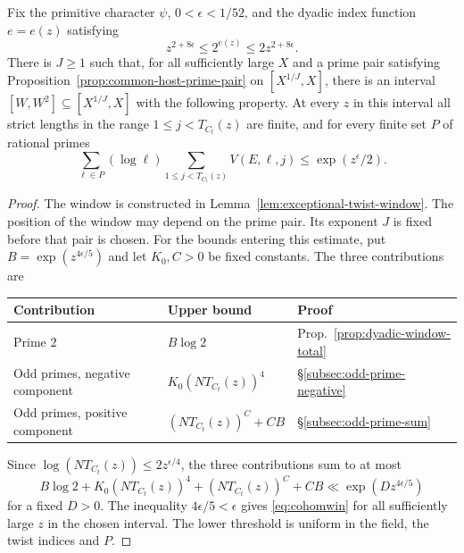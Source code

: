 \begin{proposition}
\label{prop:original-window-budget}
Fix the primitive character \(\psi\), \(0<\epsilon<1/52\), and the
dyadic index function \(e=e(z)\) satisfying
\[
                z^{2+8\epsilon}\le2^{e(z)}\le2z^{2+8\epsilon}.
\]
There is \(J\ge1\) such that, for all sufficiently large \(X\) and a
prime pair satisfying Proposition~\ref{prop:common-host-prime-pair} on
\([X^{1/J},X]\), there is an interval
\([W,W^2]\subseteq[X^{1/J},X]\) with the following property.
At every \(z\) in this interval all strict lengths in the range
\(1\le j<T_{C_t}(z)\) are finite, and for every finite set \(P\)
of rational primes
\begin{equation}\label{eq:cohomwin}
 \sum_{\ell\in P}(\log\ell)
       \sum_{1\le j<T_{C_t}(z)} V(E,\ell,j)
       \le \exp(z^\epsilon/2).
\end{equation}
\end{proposition}
\begin{proof}
The window is constructed in Lemma~\ref{lem:exceptional-twist-window}.
The position of the window may depend on the prime pair. Its exponent
\(J\) is fixed before that pair is chosen.
For the bounds entering this estimate, put
\(B=\exp(z^{4\epsilon/5})\) and let \(K_0,C>0\) be fixed
constants. The three contributions are
\begin{center}
\begin{tabular}{@{}lll@{}}
Contribution & Upper bound & Proof \\
\hline
Prime \(2\) & \(B\log 2\) & Prop.~\ref{prop:dyadic-window-total} \\
Odd primes, negative component & \(K_0(NT_{C_t}(z))^4\) &
  \S\ref{subsec:odd-prime-negative} \\
Odd primes, positive component & \((NT_{C_t}(z))^C+CB\) &
  \S\ref{subsec:odd-prime-sum}
\end{tabular}
\end{center}
Since \(\log(NT_{C_t}(z))\le2z^{\epsilon/4}\), the three contributions sum to at most
\[
 B\log2+ K_0(NT_{C_t}(z))^4+(NT_{C_t}(z))^C+CB\ll \exp(Dz^{4\epsilon/5})
\]
for a fixed \(D>0\). The inequality
\(4\epsilon/5<\epsilon\) gives \eqref{eq:cohomwin} for all
sufficiently large \(z\) in the chosen interval. The lower
threshold is uniform in the field, the twist indices and \(P\).
\end{proof}

